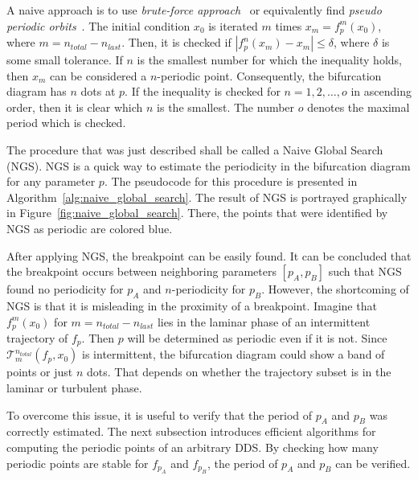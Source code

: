 \par
A naive approach is to use \emph{brute-force approach}~\cite{Parker1989} or equivalently find \emph{pseudo periodic orbits}~\cite{Galias2023}.
The initial condition $x_0$ is iterated $m$ times $x_{m} = f^{m}_{p}(x_0)$, where $m = n_{total}-n_{last}$.
Then, it is checked if $|f^{n}_{p}(x_m) - x_m| \leq \delta$, where $\delta$ is some small tolerance.
If $n$ is the smallest number for which the inequality holds, then $x_m$ can be considered a $n$-periodic point.
Consequently, the bifurcation diagram has $n$ dots at $p$.
If the inequality is checked for $n = 1,2,\dots,o$ in ascending order, then it is clear which $n$ is the smallest.
The number $o$ denotes the maximal period which is checked.
\par
The procedure that was just described shall be called a Naive Global Search (NGS).
NGS is a quick way to estimate the periodicity in the bifurcation diagram for any parameter $p$.
The pseudocode for this procedure is presented in Algorithm~\ref{alg:naive_global_search}.
The result of NGS is portrayed graphically in Figure~\ref{fig:naive_global_search}.
There, the points that were identified by NGS as periodic are colored blue.
\par
After applying NGS, the breakpoint can be easily found.
It can be concluded that the breakpoint occurs between neighboring parameters $[p_{A}, p_{B}]$ such that NGS found no periodicity for $p_{A}$ and $n$-periodicity for $p_{B}$.
However, the shortcoming of NGS is that it is misleading in the proximity of a breakpoint.
Imagine that $f^{m}_{p}(x_0)$ for $m = n_{total}-n_{last}$ lies in the laminar phase of an intermittent trajectory of $f_{p}$.
Then $p$ will be determined as periodic even if it is not.
Since $\mathcal{T}_{m}^{n_{total}}(f_{p}, x_{0})$ is intermittent, the bifurcation diagram could show a band of points or just $n$ dots.
That depends on whether the trajectory subset is in the laminar or turbulent phase.
\par
To overcome this issue, it is useful to verify that the period of $p_{A}$ and $p_{B}$ was correctly estimated.
The next subsection introduces efficient algorithms for computing the periodic points of an arbitrary DDS.
By checking how many periodic points are stable for $f_{p_{A}}$ and $f_{p_{B}}$, the period of $p_{A}$ and $p_{B}$ can be verified.

